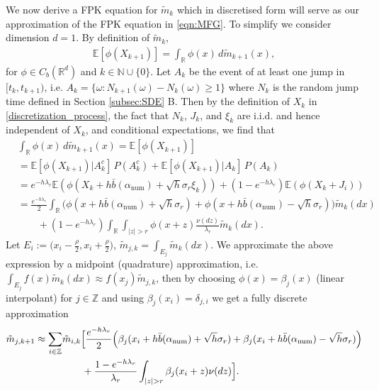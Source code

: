 \documentclass[a4paper,  twoside, 10pt, leqno]{amsart}
\newcommand{\Z}{\mathbb{Z}}
\newcommand{\R}{\mathbb{R}}
\theoremstyle{remark}
\theoremstyle{definition}
\begin{document}
We now derive a FPK equation for $\tilde m_k$ which in discretised form will serve as our approximation of the FPK equation in \eqref{eqn:MFG}. To simplify we consider dimension $d=1$. By definition of $\tilde m_k$, 
\begin{align*}
\mathbb{E}[\phi(X_{k+1})] = \int_{\R} \phi(x) \,  d\tilde m_{k+1}(x),
\end{align*}
for $\phi\in
C_b(\R^d)$ and $k \in \mathbb{N}\cup \{0\}$. Let $A_{k}$ be the event
of at least one jump in $[t_k,t_{k+1})$, i.e. $A_{k}= \{\omega:
N_{k+1}(\omega)- N_{k}(\omega)\geq 1  \}$ where $N_k$ is the random jump
time defined in Section \ref{subsec:SDE} B. Then by the definition of $X_k$ in
\eqref{discretization_process}, the fact that $N_k$, $J_k$, and $\xi_k$ are
i.i.d. and hence independent of $X_k$, and conditional expectations,
we find that 
\begin{align*}
& \int_{\R} \phi(x) \,  d\tilde m_{k+1}(x) = \mathbb{E}[\phi(X_{k+1})] \\
& = \mathbb{E}[\phi(X_{k+1})| A_{k}^c] \, P(A_{k}^c) + \mathbb{E}[\phi(X_{k+1})| A_{k}] \, P(A_{k})  \\
& = e^{-h \lambda_r} \mathbb{E}(\phi(X_k + h \bar{b}(\alpha_{\text{num}}) + \sqrt{h}\sigma_r \xi_{k})) + (1-e^{-h \lambda_r}) \mathbb{E}(\phi(X_k + J_i))  \\ 
& = \frac{e^{-h \lambda_r}}{2} \int_{\R} \big( \phi(x+h \bar{b}(\alpha_{\text{num}}) + \sqrt{h}\sigma_r) + \phi(x+h \bar{b}(\alpha_{\text{num}}) - \sqrt{h}\sigma_r)\big) \tilde m_k(dx) \\
& \qquad + (1-e^{-h \lambda_r})  \int_{\R} \int_{|z|>r} \phi(x+z) \frac{\nu(dz)}{\lambda_r} \tilde m_k(dx). 
\end{align*}
Let $ E_i:= \big(x_i- \frac{\rho}{2}, x_i + \frac{\rho}{2}\big)$,
$\tilde m_{j,k} =  \int_{E_j} \tilde m_k(dx)$. We approximate the above expression by a midpoint (quadrature) approximation, i.e. $\int_{E_j} f(x) \tilde m_{k}(dx) \approx f(x_j) \tilde m_{j,k}$,  then by choosing $\phi(x) = \beta_j(x)$ (linear interpolant) for $j\in \Z$ and using $\beta_j(x_i)= \delta_{j,i}$ we get a fully discrete approximation
\begin{align*} %
\tilde  m_{j,k+1} \approx \sum_{i\in \Z} & \tilde  m_{i,k}\Big[ \frac{e^{-h \lambda_r}}{2} \Big(
\beta_j(x_i+h \bar{b}(\alpha_{\text{num}}) + \sqrt{h}\sigma_r) + \beta_j(x_i+h
\bar{b}(\alpha_{\text{num}}) - \sqrt{h}\sigma_r)\Big) \\
&  \qquad + \frac{1-e^{-h \lambda_r}}{\lambda_r} \int_{|z|>r} \beta_j(x_i+z) \nu(dz)\Big] . \notag
\end{align*}
\end{document}
